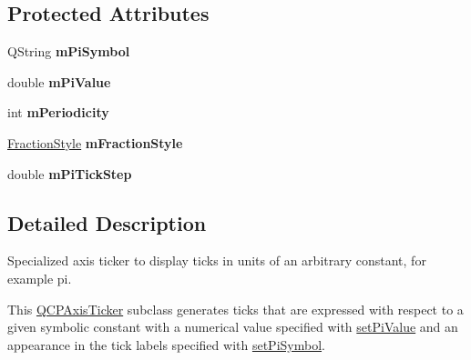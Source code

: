 \subsection*{Protected Attributes}
\begin{DoxyCompactItemize}
\item 
Q\+String {\bfseries m\+Pi\+Symbol}\hypertarget{class_q_c_p_axis_ticker_pi_a0962084571116e4d98e4dccc2e68f5ea}{}\label{class_q_c_p_axis_ticker_pi_a0962084571116e4d98e4dccc2e68f5ea}

\item 
double {\bfseries m\+Pi\+Value}\hypertarget{class_q_c_p_axis_ticker_pi_ab3e899a3d23ada89eb48b465204b09ea}{}\label{class_q_c_p_axis_ticker_pi_ab3e899a3d23ada89eb48b465204b09ea}

\item 
int {\bfseries m\+Periodicity}\hypertarget{class_q_c_p_axis_ticker_pi_af5372570aa91ef3b0586939d91c119db}{}\label{class_q_c_p_axis_ticker_pi_af5372570aa91ef3b0586939d91c119db}

\item 
\hyperlink{class_q_c_p_axis_ticker_pi_a262f1534c7f0c79a7d5237f5d1e2c54c}{Fraction\+Style} {\bfseries m\+Fraction\+Style}\hypertarget{class_q_c_p_axis_ticker_pi_a34db3e41fbc1e91426841ca040930595}{}\label{class_q_c_p_axis_ticker_pi_a34db3e41fbc1e91426841ca040930595}

\item 
double {\bfseries m\+Pi\+Tick\+Step}\hypertarget{class_q_c_p_axis_ticker_pi_a943706b7796d778c62915498864bbeb8}{}\label{class_q_c_p_axis_ticker_pi_a943706b7796d778c62915498864bbeb8}

\end{DoxyCompactItemize}


\subsection{Detailed Description}
Specialized axis ticker to display ticks in units of an arbitrary constant, for example pi. 



This \hyperlink{class_q_c_p_axis_ticker}{Q\+C\+P\+Axis\+Ticker} subclass generates ticks that are expressed with respect to a given symbolic constant with a numerical value specified with \hyperlink{class_q_c_p_axis_ticker_pi_a36ce0651d2ec92edd36feac1619c2468}{set\+Pi\+Value} and an appearance in the tick labels specified with \hyperlink{class_q_c_p_axis_ticker_pi_acfdcd4758a393bde4be12a50fb2017b5}{set\+Pi\+Symbol}.

